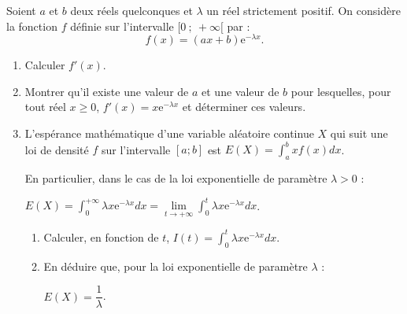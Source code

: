 
\par
Soient $a$ et $b$ deux réels quelconques et $\lambda$ un réel strictement positif. On considère la fonction $f$ définie sur l'intervalle $[0~;~+\infty[$ par :
\[f(x)=(ax+b)\text{e}^{-\lambda x}.\]
\begin{enumerate}
     \item %
     Calculer $f'(x)$.
     \item %
     Montrer qu'il existe une valeur de $a$ et une valeur de $b$ pour lesquelles, pour tout réel $x \geqslant 0$, $f'(x)=x\text{e}^{-\lambda x}$ et déterminer ces valeurs.
     \item %
     L'espérance mathématique d'une variable aléatoire continue $X$ qui suit une loi de densité $f$ sur l'intervalle $\left[a;b\right]$ est $E\left(X\right)=\int_{a}^{b}xf\left(x\right)dx$.
     \par
     En particulier, dans le cas de la loi exponentielle de paramètre $\lambda > 0$ :
     \begin{center}
          $E(X)=\displaystyle\int_{0}^{+\infty}\lambda x \text{e}^{-\lambda x}dx$\nosp$=\lim\limits_{t \rightarrow +\infty}\displaystyle\int_{0}^{t}\lambda x \text{e}^{-\lambda x}dx$.
     \end{center}
     \begin{enumerate}[label=\alph*.]
          \item %
          Calculer, en fonction de $t$,  $I(t)=\displaystyle\int_{0}^{t}\lambda x \text{e}^{-\lambda x}dx$.
          \item %
          En déduire que, pour la loi exponentielle de paramètre $\lambda$ :
          \begin{center}
               $E(X)=\dfrac{1}{\lambda }$.
          \end{center}
     \end{enumerate}
\end{enumerate}
